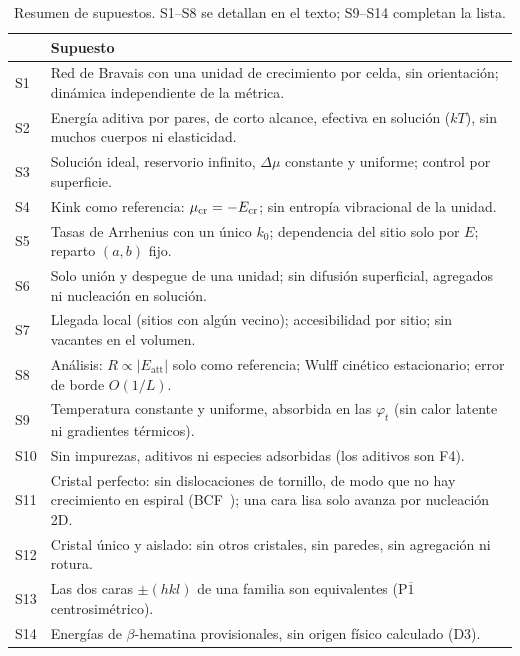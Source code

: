 \documentclass[11pt,a4paper]{article}
\newcommand{\Ecr}{E_{\mathrm{cr}}}
\newcommand{\Eatt}{E_{\mathrm{att}}}
\newcommand{\dmu}{\Delta\mu}
\newcommand{\bh}{$\beta$-hematina}
\begin{document}
\begin{table}[H]
\centering\small
\caption{Resumen de supuestos. S1--S8 se detallan en el texto; S9--S14 completan la lista.}
\label{tab:supuestos}
\begin{tabularx}{\linewidth}{@{}lY@{}}
\toprule
& Supuesto\\
\midrule
S1 & Red de Bravais con una unidad de crecimiento por celda, sin orientación; dinámica independiente de la métrica.\\
S2 & Energía aditiva por pares, de corto alcance, efectiva en solución ($kT$), sin muchos cuerpos ni elasticidad.\\
S3 & Solución ideal, reservorio infinito, $\dmu$ constante y uniforme; control por superficie.\\
S4 & Kink como referencia: $\mu_{\rm cr}=-\Ecr$; sin entropía vibracional de la unidad.\\
S5 & Tasas de Arrhenius con un único $k_0$; dependencia del sitio solo por $E$; reparto $(a,b)$ fijo.\\
S6 & Solo unión y despegue de una unidad; sin difusión superficial, agregados ni nucleación en solución.\\
S7 & Llegada local (sitios con algún vecino); accesibilidad por sitio; sin vacantes en el volumen.\\
S8 & Análisis: $R\propto|\Eatt|$ solo como referencia; Wulff cinético estacionario; error de borde $O(1/L)$.\\
S9 & Temperatura constante y uniforme, absorbida en las $\varphi_t$ (sin calor latente ni gradientes térmicos).\\
S10 & Sin impurezas, aditivos ni especies adsorbidas (los aditivos son F4).\\
S11 & Cristal perfecto: sin dislocaciones de tornillo, de modo que no hay crecimiento en espiral (BCF~\cite{bcf1951}); una cara lisa solo avanza por nucleación 2D.\\
S12 & Cristal único y aislado: sin otros cristales, sin paredes, sin agregación ni rotura.\\
S13 & Las dos caras $\pm(hkl)$ de una familia son equivalentes (P$\overline1$ centrosimétrico).\\
S14 & Energías de \bh{} provisionales, sin origen físico calculado (D3).\\
\bottomrule
\end{tabularx}
\end{table}
\end{document}
